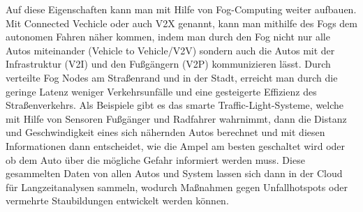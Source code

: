 \documentclass[10pt, a4paper, twocolumn]{article}
\begin{document}
Auf diese Eigenschaften kann man mit Hilfe von Fog-Computing weiter aufbauen. Mit Connected Vechicle oder auch V2X genannt, kann man mithilfe des Fogs dem autonomen Fahren näher kommen, indem man durch den Fog nicht nur alle Autos miteinander (Vehicle to Vehicle/V2V) sondern auch die Autos mit der Infrastruktur (V2I) und den Fußgängern (V2P) kommunizieren lässt.
Durch verteilte Fog Nodes am Straßenrand und in der Stadt, erreicht man durch die geringe Latenz weniger Verkehrsunfälle und eine gesteigerte Effizienz des Straßenverkehrs.
Als Beispiele gibt es das smarte Traffic-Light-Systeme, welche mit Hilfe von Sensoren Fußgänger und Radfahrer wahrnimmt, dann die Distanz und Geschwindigkeit eines sich nähernden Autos berechnet und mit diesen Informationen dann entscheidet, wie die Ampel am besten geschaltet wird oder ob dem Auto über die mögliche Gefahr informiert werden muss.
Diese gesammelten Daten von allen Autos und System lassen sich dann in der Cloud für Langzeitanalysen sammeln, wodurch Maßnahmen gegen Unfallhotspots oder vermehrte Staubildungen entwickelt werden können.


\nocite{*}


\listoffigures
\end{document}
